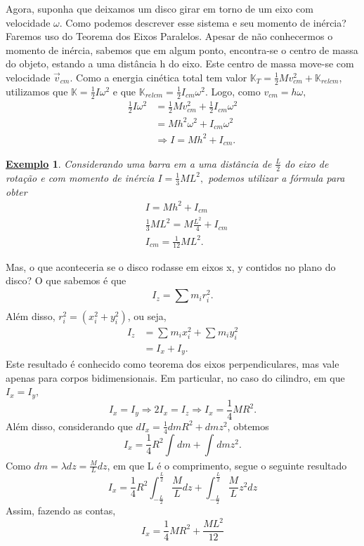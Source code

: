 \documentclass{article}
\newtheorem{example}{\underline{Exemplo}}
\begin{document}
    Agora, suponha que deixamos um disco girar em torno de um eixo com velocidade \(\omega \). Como podemos descrever esse sistema e seu momento de inércia? 
Faremos uso do Teorema dos Eixos Paralelos. Apesar de não conhecermos o momento de inércia, sabemos que em algum ponto, encontra-se o centro
de massa do objeto, estando a uma distância h do eixo. Este centro de massa move-se com velocidade \(\vec{v}_{cm}\). Como a energia cinética total
tem valor \(\mathbb{K}_{T} = \frac{1}{2}Mv_{cm}^{2} + \mathbb{K}_{relcm}\), utilizamos que \(\mathbb{K} = \frac{1}{2}I\omega^{2}\) e que \(\mathbb{K}_{relcm}=\frac{1}{2}I_{cm}\omega ^{2}\).
Logo, como \(v_{cm} = h\omega ,\)
 \begin{align*}
   \frac{1}{2}I\omega^{2} &= \frac{1}{2} Mv_{cm}^{2} + \frac{1}{2}I_{cm}\omega^{2}\\
                          &= Mh^{2}\omega^{2} + I_{cm}\omega ^{2}\\
                          &\Rightarrow I = Mh^{2} + I_{cm}.
 \end{align*}
 \begin{example}
   Considerando uma barra em a uma distância de \(\frac{L}{2}\) do eixo de rotação e com momento de inércia 
  \(I = \frac{1}{3}ML^{2},\) podemos utilizar a fórmula para obter 
 \begin{align*}
   &I = Mh^{2} + I_{cm}\\
   &\frac{1}{3}ML^{2} = M \frac{L^{2}}{4} + I_{cm}\\
   &I_{cm} = \frac{1}{12}ML^{2}.
 \end{align*}
 \end{example}
    Mas, o que aconteceria se o disco rodasse em eixos x, y contidos no plano do disco? O que sabemos é que 
      \[
        I_{z} = \sum\limits_{}^{}m_{i}r_{i}^{2}.
      \]
  Além disso, \(r_{i}^{2} = (x_{i}^{2} + y_{i}^{2})\), ou seja, 
 \begin{align*}
   I_{z} &= \sum\limits_{}^{}m_{i}x_{i}^{2} + \sum\limits_{}^{}m_{i}y_{i}^{2}\\
         &= I_{x} + I_{y}.
 \end{align*}
  Este resultado é conhecido como teorema dos eixos perpendiculares, mas vale apenas para corpos bidimensionais.
Em particular, no caso do cilindro, em que \(I_{x} = I_{y},\) 
  \[
    I_{x} = I_{y} \Rightarrow 2I_{x} = I_{z} \Rightarrow I_{x} = \frac{1}{4}MR^{2}.
  \]
  Além disso, considerando que \(dI_{x} = \frac{1}{4}dm R^{2} + dm z^{2}\), obtemos 
    \[
      I_{x} = \frac{1}{4}R^{2} \int_{}^{}dm + \int_{}^{}dm z^{2}.
    \]
    Como \(dm = \lambda dz = \frac{M}{L}dz\), em que L é o comprimento, segue o seguinte resultado 
      \[
        I_{x} = \frac{1}{4}R^{2}\int_{-\frac{L}{2}}^{\frac{L}{2}}\frac{M}{L}dz + \int_{-\frac{L}{2}}^{\frac{L}{2}}\frac{M}{L}z^{2}dz
      \]
    Assim, fazendo as contas, 
      \[
        I_{x} = \frac{1}{4}MR^{2} + \frac{ML^{2}}{12}
      \]
\end{document}
